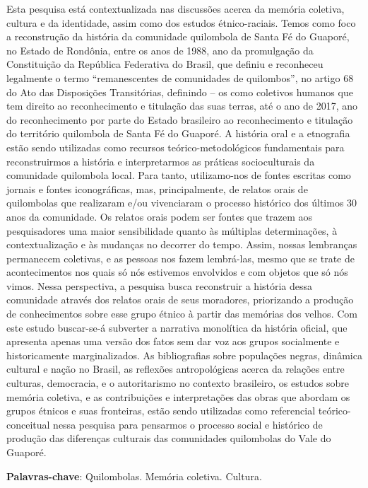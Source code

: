\documentclass[article,12pt,onesidea,4paper,english,brazil]{abntex2}
\begin{document}
	\noindent Esta pesquisa está contextualizada nas discussões acerca da memória coletiva,
	cultura e da identidade, assim como dos estudos étnico-raciais. Temos como foco a
	reconstrução da história da comunidade quilombola de Santa Fé do Guaporé, no
	Estado de Rondônia, entre os anos de 1988, ano da promulgação da Constituição
	da República Federativa do Brasil, que definiu e reconheceu legalmente o termo
	“remanescentes de comunidades de quilombos”, no artigo 68 do Ato das
	Disposições Transitórias, definindo – os como coletivos humanos que tem direito ao
	reconhecimento e titulação das suas terras, até o ano de 2017, ano do
	reconhecimento por parte do Estado brasileiro ao reconhecimento e titulação do
	território quilombola de Santa Fé do Guaporé. A história oral e a etnografia estão
	sendo utilizadas como recursos teórico-metodológicos fundamentais para
	reconstruirmos a história e interpretarmos as práticas socioculturais da comunidade
	quilombola local. Para tanto, utilizamo-nos de fontes escritas como jornais e fontes
	iconográficas, mas, principalmente, de relatos orais de quilombolas que realizaram
	e/ou vivenciaram o processo histórico dos últimos 30 anos da comunidade. Os
	relatos orais podem ser fontes que trazem aos pesquisadores uma maior
	sensibilidade quanto às múltiplas determinações, à contextualização e às mudanças
	no decorrer do tempo. Assim, nossas lembranças permanecem coletivas, e as
	pessoas nos fazem lembrá-las, mesmo que se trate de acontecimentos nos quais só
	nós estivemos envolvidos e com objetos que só nós vimos. Nessa perspectiva, a
	pesquisa busca reconstruir a história dessa comunidade através dos relatos orais de
	seus moradores, priorizando a produção de conhecimentos sobre esse grupo étnico
	à partir das memórias dos velhos. Com este estudo buscar-se-á subverter a
	narrativa monolítica da história oficial, que apresenta apenas uma versão dos fatos
	sem dar voz aos grupos socialmente e historicamente marginalizados. As
	bibliografias sobre populações negras, dinâmica cultural e nação no Brasil, as
	reflexões antropológicas acerca da relações entre culturas, democracia, e o
	autoritarismo no contexto brasileiro, os estudos sobre memória coletiva, e as
	contribuições e interpretações das obras que abordam os grupos étnicos e suas
	fronteiras, estão sendo utilizadas como referencial teórico-conceitual nessa pesquisa
	para pensarmos o processo social e histórico de produção das diferenças culturais
	das comunidades quilombolas do Vale do Guaporé.
	
	\vspace{\onelineskip}
	
	\noindent
	\textbf{Palavras-chave}: Quilombolas. Memória coletiva. Cultura.
	
\end{document}
